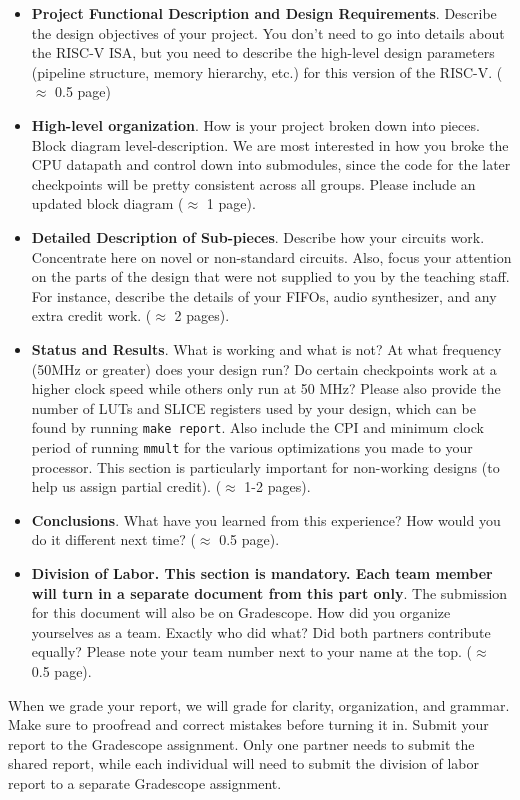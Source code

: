 \documentclass[11pt]{article}
\begin{document}
\begin{itemize}
  \item \textbf{Project Functional Description and Design Requirements}. Describe the design objectives of your project.  You don't need to go into details about the RISC-V ISA, but you need to describe the high-level design parameters (pipeline structure, memory hierarchy, etc.) for this version of the RISC-V. ($\approx$ 0.5 page)
  \item \textbf{High-level organization}. How is your project broken down into pieces. Block diagram level-description. We are most interested in how you broke the CPU datapath and control
  down into submodules, since the code for the later checkpoints will be pretty consistent across all groups. Please include an updated block diagram ($\approx$ 1 page).
  \item \textbf{Detailed Description of Sub-pieces}. Describe how your circuits work. Concentrate here on novel or non-standard circuits. Also, focus your attention on the parts of the design that were not supplied to you by the teaching staff. For instance, describe the details of your FIFOs, audio synthesizer, and any extra credit work. ($\approx$ 2 pages).
  \item \textbf{Status and Results}. What is working and what is not? At what frequency (50MHz or greater) does your design run? Do certain checkpoints work at a higher clock speed while others only run at 50 MHz? Please also provide the number of LUTs and SLICE registers used by your design, which can be found by running \verb|make report|. Also include the CPI and minimum clock period of running \verb|mmult| for the various optimizations you made to your processor. This section is particularly important for non-working designs (to help us assign partial credit). ($\approx$ 1-2 pages).
  \item \textbf{Conclusions}. What have you learned from this experience? How would you do it different next time? ($\approx$ 0.5 page).
  \item \textbf{Division of Labor. This section is mandatory. Each team member will turn in a separate document from this part only}. The submission for this document will also be on Gradescope. How did you organize yourselves as a team. Exactly who did what? Did both partners contribute equally? Please note your team number next to your name at the top. ($\approx$ 0.5 page).
\end{itemize}

When we grade your report, we will grade for clarity, organization, and grammar. Make sure to proofread and correct mistakes before turning it in. Submit your report to the Gradescope assignment. Only one partner needs to submit the shared report, while each individual will need to submit the division of labor report to a separate Gradescope assignment.
\end{document}
